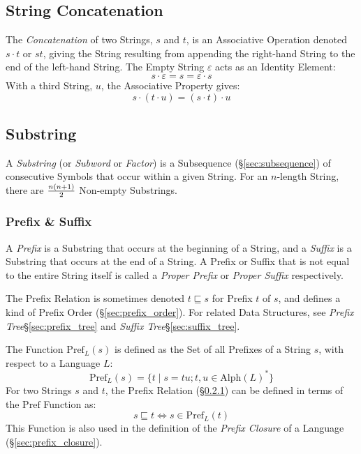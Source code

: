 \subsection{String Concatenation}\label{sec:string_concatenation}

The \emph{Concatenation} of two Strings, $s$ and $t$, is an
Associative Operation denoted $s \cdot t$ or $st$, giving the String
resulting from appending the right-hand String to the end of the
left-hand String. The Empty String $\varepsilon$ acts as an Identity
Element:
\[
  s \cdot \varepsilon = s = \varepsilon \cdot s
\]
With a third String, $u$, the Associative Property gives:
\[
  s \cdot (t \cdot u) = (s \cdot t) \cdot u
\]



\subsection{Substring}\label{sec:substring}

A \emph{Substring} (or \emph{Subword} or \emph{Factor}) is a
Subsequence (\S\ref{sec:subsequence}) of consecutive Symbols that
occur within a given String. For an $n$-length String, there are
$n(n+1) \over 2$ Non-empty Substrings.



\subsubsection{Prefix \& Suffix}\label{sec:prefix_suffix}

A \emph{Prefix} is a Substring that occurs at the beginning of a
String, and a \emph{Suffix} is a Substring that occurs at the end of a
String. A Prefix or Suffix that is not equal to the entire String
itself is called a \emph{Proper Prefix} or \emph{Proper Suffix}
respectively.

The Prefix Relation is sometimes denoted $t \sqsubseteq s$ for Prefix
$t$ of $s$, and defines a kind of Prefix Order
(\S\ref{sec:prefix_order}). For related Data Structures, see
\emph{Prefix Tree}\S\ref{sec:prefix_tree} and \emph{Suffix
  Tree}\S\ref{sec:suffix_tree}.

The Function $\mathrm{Pref}_L(s)$ is defined as the Set of all
Prefixes of a String $s$, with respect to a Language $L$:
\[
  \mathrm{Pref}_L(s) =
    \{ t\;|\;s = tu; t,u \in \mathrm{Alph}(L)^* \}
\]
For two Strings $s$ and $t$, the Prefix Relation
(\S\ref{sec:prefix_suffix}) can be defined in terms of the
$\mathrm{Pref}$ Function as:
\[
  s \sqsubseteq t \Leftrightarrow s \in \mathrm{Pref}_L(t)
\]
This Function is also used in the definition of the \emph{Prefix Closure}
of a Language (\S\ref{sec:prefix_closure}).



